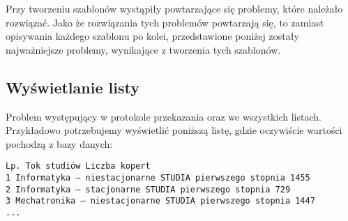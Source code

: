 Przy tworzeniu szablonów wystąpiły powtarzające się problemy, które należało rozwiązać.  Jako że rozwiązania tych problemów powtarzają się, to zamiast opisywania każdego szablonu po kolei, przedstawione poniżej zostały najważniejsze problemy, wynikające z tworzenia tych szablonów.

\subsection{Wyświetlanie listy}
Problem występujący w protokole przekazania oraz we wszystkich listach. Przykładowo potrzebujemy wyświetlić poniższą listę, gdzie oczywiście wartości pochodzą z bazy danych:
\begin{verbatim}
Lp. Tok studiów Liczba kopert
1 Informatyka — niestacjonarne STUDIA pierwszego stopnia 1455
2 Informatyka — stacjonarne STUDIA pierwszego stopnia 729
3 Mechatronika — niestacjonarne STUDIA pierwszego stopnia 1447
...
\end{verbatim}


